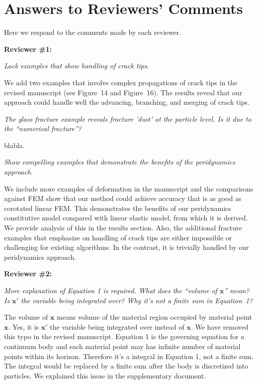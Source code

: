 \section{Answers to Reviewers' Comments}

Here we respond to the comments made by each reviewer.

\noindent{}\textbf{Reviewer \#1:}

\emph{Lack examples that show handling of crack tips.}

We add two examples that involve complex propagations of crack tips in the revised manuscript (see Figure~14 and Figure~16). The results reveal that our approach could handle well the advancing, branching, and merging of crack tips.

\emph{The glass fracture example reveals fracture 'dust' at the particle level. Is it due to the ``numerical fracture''?}

blabla.

\emph{Show compelling examples that demonstrate the benefits of the peridynamics approach.}

We include more examples of deformation in the manuscript and the comparisons against FEM show that our method could achieve accuracy that is as good as corotated linear FEM. This demonstrates the benefits of our peridynamics constitutive model compared with linear elastic model, from which it is derived. We provide analysis of this in the results section. Also, the additional fracture examples that emphasize on handling of crack tips are either impossible or challenging for existing algorithms. In the contrast, it is trivially handled by our peridynamics approach.

\noindent{}\textbf{Reviewer \#2:}

\emph{More explanation of Equation 1 is required. What does the ``volume of $\mathbf{x}$'' mean? Is $\mathbf{x}'$ the variable being integrated over? Why it's not a finite sum in Equation~1?}

The volume of $\mathbf{x}$ means volume of the material region occupied by material point $\mathbf{x}$. Yes, it is $\mathbf{x}'$ the variable being integrated over instead of $\mathbf{x}$. We have removed this typo in the revised manuscript. Equation 1 is the governing equation for a continuum body and each material point may has infinite number of material points within its horizon. Therefore it's a integral in Equation 1, not a finite sum. The integral would be replaced by a finite sum after the body is discretized into particles. We explained this issue in the supplementary document.

